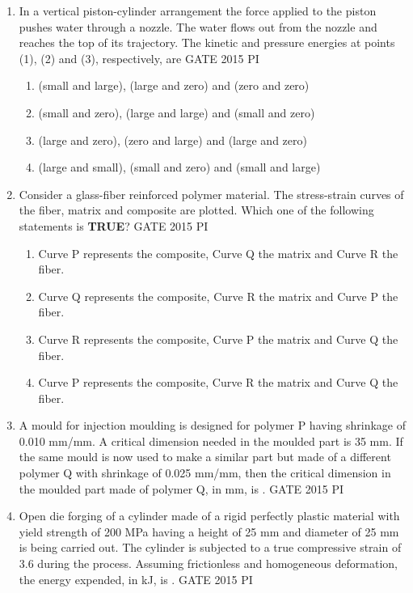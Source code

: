 \documentclass[journal,12pt,onecolumn]{IEEEtran}
\theoremstyle{remark}
\begin{document}
\begin{enumerate}
\item In a vertical piston-cylinder arrangement the force applied to the piston pushes water through a nozzle. The water flows out from the nozzle and reaches the top of its trajectory. The kinetic and pressure energies at points (1), (2) and (3), respectively, are \hfill{GATE 2015 PI}
\begin{enumerate}
    \item (small and large), (large and zero) and (zero and zero)
    \item (small and zero), (large and large) and (small and zero)
    \item (large and zero), (zero and large) and (large and zero)
    \item (large and small), (small and zero) and (small and large)
\end{enumerate}
\item Consider a glass-fiber reinforced polymer material. The stress-strain curves of the fiber, matrix and composite are plotted. Which one of the following statements is \textbf{TRUE}? \hfill{GATE 2015 PI}
\begin{enumerate}
    \item Curve P represents the composite, Curve Q the matrix and Curve R the fiber.
    \item Curve Q represents the composite, Curve R the matrix and Curve P the fiber.
    \item Curve R represents the composite, Curve P the matrix and Curve Q the fiber.
    \item Curve P represents the composite, Curve R the matrix and Curve Q the fiber.
\end{enumerate}
\item A mould for injection moulding is designed for polymer P having shrinkage of 0.010 mm/mm. A critical dimension needed in the moulded part is 35 mm. If the same mould is now used to make a similar part but made of a different polymer Q with shrinkage of 0.025 mm/mm, then the critical dimension in the moulded part made of polymer Q, in mm, is \underline{\hspace{2cm}}. \hfill{GATE 2015 PI}

\item Open die forging of a cylinder made of a rigid perfectly plastic material with yield strength of 200 MPa having a height of 25 mm and diameter of 25 mm is being carried out. The cylinder is subjected to a true compressive strain of 3.6 during the process. Assuming frictionless and homogeneous deformation, the energy expended, in kJ, is \underline{\hspace{2cm}}. \hfill{GATE 2015 PI}


\end{enumerate}
\end{document}
